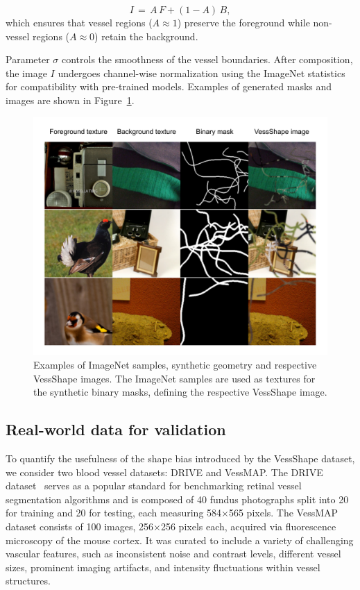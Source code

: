\documentclass[%
reprint,
nofootinbib,
 amsmath,amssymb,
aps,
superscriptaddress,
showkeys,
longbibliography
]{revtex4-1}
\begin{document}
\begin{equation}
I \,=\, A\,F + (1-A)\,B,
\label{eq:compose}
\end{equation}
which ensures that vessel regions ($A \approx 1$) preserve the foreground while non-vessel regions ($A \approx 0$) retain the background. 

Parameter $\sigma$ controls the smoothness of the vessel boundaries. After composition, the image $I$ undergoes channel-wise normalization using the ImageNet statistics for compatibility with pre-trained models. Examples of generated masks and images are shown in Figure~\ref{f:vessshape_sample}.


\begin{figure}[tbp]
    \centering
    \includegraphics[width=\columnwidth]{figures/results/vessshape_sample.pdf}
    \caption{Examples of ImageNet samples, synthetic geometry and respective VessShape images. The ImageNet samples are used as textures for the synthetic binary masks, defining the respective VessShape image.}
    \label{f:vessshape_sample}
\end{figure}

\subsection{Real-world data for validation}

To quantify the usefulness of the shape bias introduced by the VessShape dataset, we consider two blood vessel datasets: DRIVE and VessMAP. The DRIVE dataset~\cite{} serves as a popular standard for benchmarking retinal vessel segmentation algorithms and is composed of 40 fundus photographs split into 20 for training and 20 for testing, each measuring 584×565 pixels. The VessMAP dataset consists of 100 images, 256×256 pixels each, acquired via fluorescence microscopy of the mouse cortex. It was curated to include a variety of challenging vascular features, such as inconsistent noise and contrast levels, different vessel sizes, prominent imaging artifacts, and intensity fluctuations within vessel structures.
\end{document}
